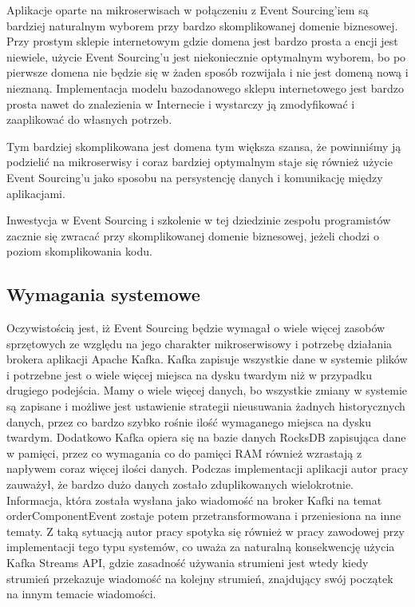 Aplikacje oparte na mikroserwisach w połączeniu z Event Sourcing'iem są bardziej naturalnym wyborem przy bardzo skomplikowanej domenie biznesowej. Przy prostym sklepie internetowym gdzie domena jest bardzo prosta a encji jest niewiele, użycie Event Sourcing'u jest niekoniecznie optymalnym wyborem, bo po pierwsze domena nie będzie się w żaden sposób rozwijała i nie jest domeną nową i nieznaną. Implementacja modelu bazodanowego sklepu internetowego jest bardzo prosta nawet do znalezienia w Internecie i wystarczy ją zmodyfikować i zaaplikować do własnych potrzeb.

Tym bardziej skomplikowana jest domena tym większa szansa, że powinniśmy ją podzielić na mikroserwisy i coraz bardziej optymalnym staje się również użycie Event Sourcing'u jako sposobu na persystencję danych i komunikację między aplikacjami.

Inwestycja w Event Sourcing i szkolenie w tej dziedzinie zespołu programistów zacznie się zwracać przy skomplikowanej domenie biznesowej, jeżeli chodzi o poziom skomplikowania kodu.

\subsection{Wymagania systemowe}
Oczywistością jest, iż Event Sourcing będzie wymagał o wiele więcej zasobów sprzętowych ze względu na jego charakter mikroserwisowy i potrzebę działania brokera aplikacji Apache Kafka. Kafka zapisuje wszystkie dane w systemie plików i potrzebne jest o wiele więcej miejsca na dysku twardym niż w przypadku drugiego podejścia. Mamy o wiele więcej danych, bo wszystkie zmiany w systemie są zapisane i możliwe jest ustawienie strategii nieusuwania żadnych historycznych danych, przez co bardzo szybko rośnie ilość wymaganego miejsca na dysku twardym. Dodatkowo Kafka opiera się na bazie danych RocksDB zapisująca dane w pamięci, przez co wymagania co do pamięci RAM również wzrastają z napływem coraz więcej ilości danych. 
Podczas implementacji aplikacji autor pracy zauważył, że bardzo dużo danych zostało zduplikowanych wielokrotnie. Informacja, która została wysłana jako wiadomość na broker Kafki na temat orderComponentEvent zostaje potem przetransformowana i przeniesiona na inne tematy. 
Z taką sytuacją autor pracy spotyka się również w pracy zawodowej przy implementacji tego typu systemów, co uważa za naturalną konsekwencję użycia Kafka Streams API, gdzie zasadność używania strumieni jest wtedy kiedy strumień przekazuje wiadomość na kolejny strumień, znajdujący swój początek na innym temacie wiadomości.


